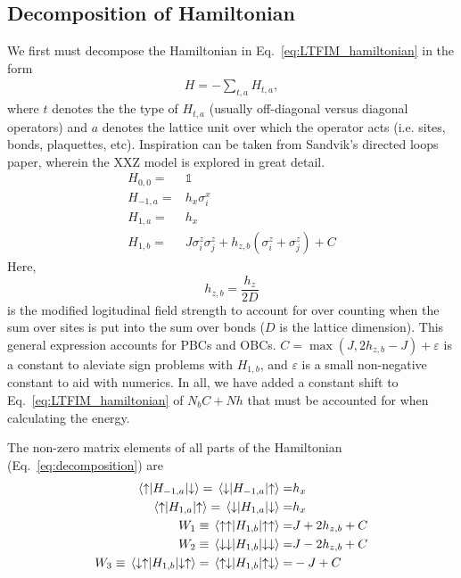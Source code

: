 \documentclass[12pt]{article}
\begin{document}
\subsection{Decomposition of Hamiltonian} \label{sec:H_decomp}

We first must decompose the Hamiltonian in Eq.~\eqref{eq:LTFIM_hamiltonian} in the form
\begin{align}
    H = - \sum_{t,a} H_{t,a},
\end{align}
where $t$ denotes the the type of $H_{t,a}$ (usually off-diagonal versus diagonal operators) and $a$ denotes the lattice unit over which the operator acts (i.e. sites, bonds, plaquettes, etc).
Inspiration can be taken from Sandvik's directed loops paper, wherein the XXZ model is explored in great detail. 
\begin{subequations} \label{eq:decomposition}
    \begin{align}
        H_{0,0} =& \mathbb{1} \\
        H_{-1,a} =& h_x \sigma_i^x \\
        H_{1,a} =& h_x \\
        H_{1,b} =& J \sigma_i^z \sigma_j^z + h_{z,b} (\sigma_i^z + \sigma_j^z) + C
    \end{align}
\end{subequations}
Here, 
\begin{equation}
    h_{z,b} = \frac{h_z}{2D}
\end{equation}
is the modified logitudinal field strength to account for over counting when the sum over sites is put into the sum over bonds ($D$ is the lattice dimension).
This general expression accounts for PBCs and OBCs.
$C = \max(J, 2 h_{z,b} - J) + \varepsilon$ is a constant to aleviate sign problems with $H_{1,b}$, and $\varepsilon$ is a small non-negative constant to aid with numerics. 
In all, we have added a constant shift to Eq.~\eqref{eq:LTFIM_hamiltonian} of $N_b C + Nh$ that must be accounted for when calculating the energy. 

The non-zero matrix elements of all parts of the Hamiltonian (Eq.~\eqref{eq:decomposition}) are
\begin{subequations} \label{eq:mat_elems}
    \begin{align}
        \matrixel{\uparrow}{H_{-1,a}}{\downarrow} = \matrixel{\downarrow}{H_{-1,a}}{\uparrow} =& h_x \\
        \matrixel{\uparrow}{H_{1,a}}{\uparrow} = \matrixel{\downarrow}{H_{1,a}}{\downarrow} =& h_x \\
        W_1 \equiv \matrixel{\uparrow \uparrow}{H_{1,b}}{\uparrow \uparrow} =& J + 2h_{z,b} + C \\
        W_2 \equiv \matrixel{\downarrow \downarrow}{H_{1,b}}{\downarrow \downarrow} =& J - 2h_{z,b} + C \\
        W_3 \equiv \matrixel{\downarrow \uparrow}{H_{1,b}}{\downarrow \uparrow} = \matrixel{\uparrow \downarrow}{H_{1,b}}{\uparrow \downarrow} =& -J + C
    \end{align}
\end{subequations}
\end{document}
